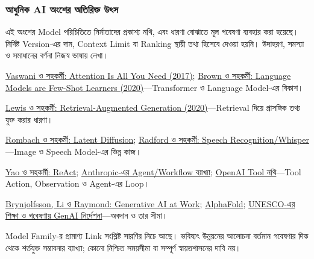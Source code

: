 \subsubsection{আধুনিক AI অংশের অতিরিক্ত উৎস}
এই অংশের Model পরিচিতিতে নির্মাতাদের প্রকাশ্য নথি, এবং ধারণা বোঝাতে মূল গবেষণা ব্যবহার করা হয়েছে। নির্দিষ্ট Version-এর দাম, Context Limit বা Ranking স্থায়ী তথ্য হিসেবে দেওয়া হয়নি। উদাহরণ, সমস্যা ও সমাধানের বর্ণনা নিজস্ব ভাষায় লেখা।
\begin{compactpoints}
\item \href{https://arxiv.org/abs/1706.03762}{Vaswani ও সহকর্মী: Attention Is All You Need (2017)}; \href{https://arxiv.org/abs/2005.14165}{Brown ও সহকর্মী: Language Models are Few-Shot Learners (2020)}---Transformer ও Language Model-এর বিকাশ।
\item \href{https://arxiv.org/abs/2005.11401}{Lewis ও সহকর্মী: Retrieval-Augmented Generation (2020)}---Retrieval দিয়ে প্রাসঙ্গিক তথ্য যুক্ত করার ধারণা।
\item \href{https://arxiv.org/abs/2112.10752}{Rombach ও সহকর্মী: Latent Diffusion}; \href{https://arxiv.org/abs/2212.04356}{Radford ও সহকর্মী: Speech Recognition/Whisper}---Image ও Speech Model-এর ভিন্ন কাজ।
\item \href{https://arxiv.org/abs/2210.03629}{Yao ও সহকর্মী: ReAct}; \href{https://www.anthropic.com/engineering/building-effective-agents}{Anthropic-এর Agent/Workflow ব্যাখ্যা}; \href{https://developers.openai.com/api/docs/guides/tools}{OpenAI Tool নথি}---Tool Action, Observation ও Agent-এর Loop।
\item \href{https://arxiv.org/abs/2304.11771}{Brynjolfsson, Li ও Raymond: Generative AI at Work}; \href{https://deepmind.google/science/alphafold/}{AlphaFold}; \href{https://www.unesco.org/en/articles/guidance-generative-ai-education-and-research}{UNESCO-এর শিক্ষা ও গবেষণায় GenAI নির্দেশনা}---অবদান ও তার সীমা।
\end{compactpoints}
Model Family-র প্রামাণ্য Link সংশ্লিষ্ট সারণির নিচে আছে। ভবিষ্যৎ উন্নয়নের আলোচনা বর্তমান গবেষণার দিক থেকে শর্তযুক্ত সম্ভাবনার ব্যাখ্যা; কোনো নিশ্চিত সময়সীমা বা সম্পূর্ণ স্বায়ত্তশাসনের দাবি নয়।
